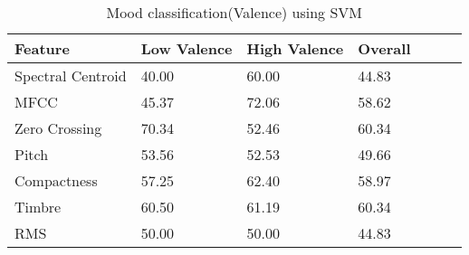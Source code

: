 \begin{table}[h!]
        \caption{Mood classification(Valence) using SVM}
        \begin{center}
                \begin{tabular}{|l|l|l|l|l|l|l|}
                        \hline

                        Feature
                        &
                        Low Valence
                        &
                        High Valence
                        &
                        Overall
                        \\\hline

                        Spectral Centroid
                        &
                        40.00
                        &
                        60.00
                        &
                        44.83
                        \\\hline

                        MFCC
                        &
                        45.37
                        &
                        72.06
                        &
                        58.62
                        \\\hline

                        Zero Crossing
                        &
                        70.34
                        &
                        52.46
                        &
                        60.34
                        \\\hline

                        Pitch
                        &
                        53.56
                        &
                        52.53
                        &
                        49.66
                        \\\hline

                        Compactness
                        &
                        57.25
                        &
                        62.40
                        &
                        58.97
                        \\\hline

                        Timbre
                        &
                        60.50
                        &
                        61.19
                        &
                        60.34
                        \\\hline

                        RMS
                        &
                        50.00
                        &
                        50.00
                        &
                        44.83
                        \\\hline


\end{tabular}
\end{center}
\end{table}
